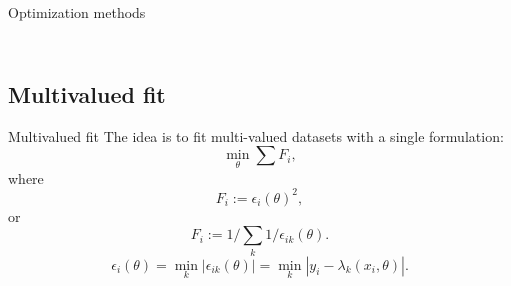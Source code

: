 \documentclass{beamer}
\begin{document}
\begin{frame}{Optimization methods}
\begin{columns}
\begin{column}{0.5\textwidth}
\begin{figure}[h]
                \label{fig:perform}
            \end{figure}
        \end{column}
    \end{columns}
\end{frame}


\subsection{Multivalued fit}
\begin{frame}{Multivalued fit}
    The idea is to fit multi-valued datasets with a single formulation:
    \begin{equation}
        \min_\theta \sum F_i,
    \end{equation}
    where
    \begin{equation}
        F_i := \epsilon_i(\theta)^2,
    \end{equation}
    or
    \begin{equation}
        F_i := 1/\sum_k 1/\epsilon_{ik}(\theta).
    \end{equation}
    \begin{equation}
        \epsilon_i(\theta) = \min_k \left|\epsilon_{ik}(\theta)\right| = \min_k \left|y_i - \lambda_k(x_i, \theta)\right|.
    \end{equation}
\end{frame}

\end{document}
